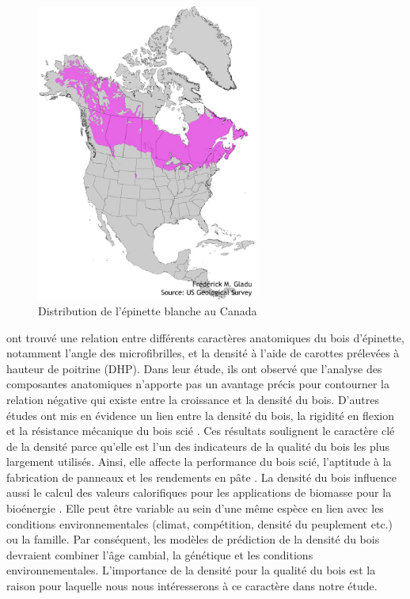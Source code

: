 \documentclass[a4paper,12pt]{report}
\begin{document}
\begin{figure}
	
	\centering
	\includegraphics[width=0.65\textwidth]{distribution.jpg}
	\caption{Distribution de l'épinette blanche au Canada}
	\label{fig:distribution}
	
	
\end{figure}


\cite{Ivkovich2002} ont trouvé une relation entre différents caractères anatomiques du bois d'épinette, notamment l'angle des microfibrilles, et la densité à l'aide de carottes prélevées à hauteur de poitrine (DHP). Dans leur étude, ils ont observé que l'analyse des composantes anatomiques n'apporte pas un avantage précis pour contourner la relation négative qui existe entre la croissance et la densité du bois. D'autres études ont mis en évidence un lien entre la densité du bois, la rigidité en flexion et la résistance mécanique du bois scié \citep{Saranpaa1994,Alteyrac2006}. Ces résultats soulignent le caractère clé de la densité parce qu'elle est l'un des indicateurs de la qualité du bois les plus largement utilisés. Ainsi, elle affecte la performance du bois scié, l'aptitude à la fabrication de panneaux et les rendements en pâte \citep{Macdonald2002}. La densité du bois influence aussi le calcul des valeurs calorifiques pour les applications de biomasse pour la bioénergie \citep{Mckendry2002}. Elle peut être variable au sein d'une même espèce en lien avec les conditions environnementales (climat, compétition, densité du peuplement etc.) ou la famille. Par conséquent, les modèles de prédiction de la densité du bois devraient combiner l'âge cambial, la génétique et les conditions environnementales. L'importance de la densité pour la qualité du bois est la raison pour laquelle nous nous intéresserons à ce caractère dans notre étude. \\
\end{document}
